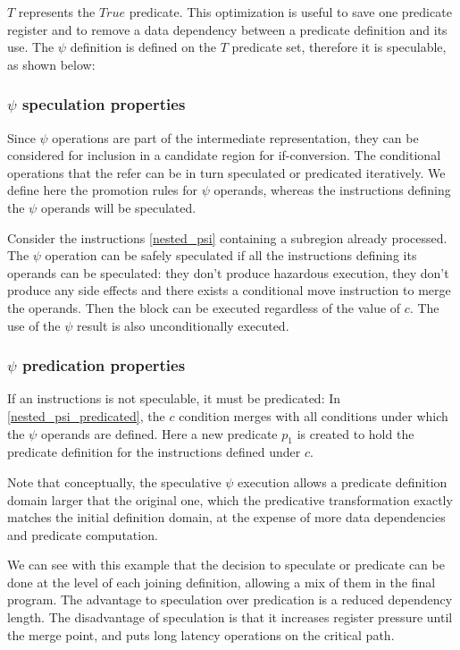 $T$ represents the $True$ predicate. This optimization is useful to save one predicate register and to remove a data dependency between a predicate definition and its use. 
The $\psi$ definition is defined on the $T$ predicate set, therefore it is speculable, as shown below:

\subsubsection{$\psi$ speculation properties}

Since $\psi$ operations are part of the intermediate representation, they can be considered for inclusion in a candidate region for if-conversion. The conditional operations that the refer can be in turn speculated or predicated iteratively. We define here the promotion rules for $\psi$ operands, whereas the instructions defining the $\psi$ operands will be speculated.

Consider the instructions \ref{nested_psi} containing a subregion already processed. The $\psi$ operation can be safely speculated if all the instructions defining its operands can be speculated: they don't produce hazardous execution, they don't produce any side effects and there exists a conditional move instruction to merge the operands. Then the block can be executed regardless of the value of $c$. The use of the $\psi$ result is also unconditionally executed.

\subsubsection{$\psi$ predication properties}

If an instructions is not speculable, it must be predicated:
In \ref{nested_psi_predicated}, the $c$ condition merges with all conditions under which the $\psi$ operands are defined. Here a new predicate $p_1$ is created to hold the predicate definition for the instructions defined under $c$. 

Note that conceptually, the speculative $\psi$ execution allows a predicate definition domain larger that the original one, which the predicative transformation exactly matches the initial definition domain, at the expense of more data dependencies and predicate computation.

We can see with this example that the decision to speculate or predicate can be done at the level of each joining definition, allowing a mix of them in the final program. The advantage to speculation over predication is a reduced dependency length. The disadvantage of speculation is that it increases register pressure until the merge point, and puts long latency operations on the critical path.
 
